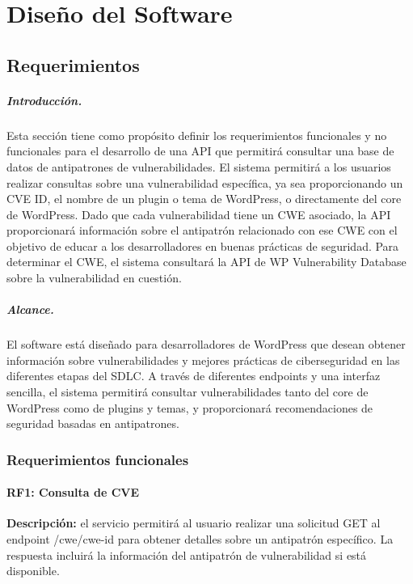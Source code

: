 \chapter{Diseño del Software}

\section{Requerimientos}

\paragraph{Introducción.}
Esta sección tiene como propósito definir los requerimientos funcionales y no funcionales para el desarrollo de una API que permitirá consultar una base de datos de antipatrones de vulnerabilidades. El sistema permitirá a los usuarios realizar consultas sobre una vulnerabilidad específica, ya sea proporcionando un CVE ID, el nombre de un plugin o tema de WordPress, o directamente del core de WordPress. Dado que cada vulnerabilidad tiene un CWE asociado, la API proporcionará información sobre el antipatrón relacionado con ese CWE con el objetivo de educar a los desarrolladores en buenas prácticas de seguridad. Para determinar el CWE, el sistema consultará la API de WP Vulnerability Database sobre la vulnerabilidad en cuestión.

\paragraph{Alcance.}

El software está diseñado para desarrolladores de WordPress que desean obtener información sobre vulnerabilidades y mejores prácticas de ciberseguridad en las diferentes etapas del SDLC. A través de diferentes endpoints y una interfaz sencilla, el sistema permitirá consultar vulnerabilidades tanto del core de WordPress como de plugins y temas, y proporcionará recomendaciones de seguridad basadas en antipatrones.


\subsection{Requerimientos funcionales}

\subsubsection{RF1: Consulta de CVE}

\textbf{Descripción:} el servicio permitirá al usuario realizar una solicitud GET al endpoint /cwe/{cwe-id} para obtener detalles sobre un antipatrón específico. La respuesta incluirá la información del antipatrón de vulnerabilidad si está disponible.

